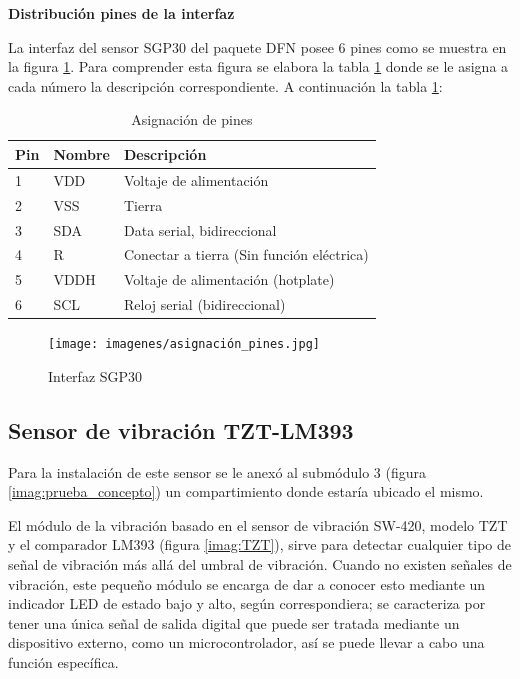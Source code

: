 \textbf{Distribución pines de la interfaz}

La interfaz del sensor SGP30 del paquete DFN posee 6 pines como se muestra en la figura \ref{imag:interfaz_sgp30}. Para comprender esta figura se elabora la tabla \ref{tab:asignacion_pines} donde se le asigna a cada número la descripción correspondiente. A continuación la tabla \ref{tab:asignacion_pines}:

\begin{table}[H]
    \centering
    \caption{Asignación de pines}
    \label{tab:asignacion_pines}
    \begin{tabular}{|l|l|l|}
    \hline
    \rowcolor[HTML]{9698ED} 
    Pin & Nombre & Descripción                               \\ \hline
    1   & VDD    & Voltaje de alimentación                   \\ \hline
    2   & VSS    & Tierra                                    \\ \hline
    3   & SDA    & Data serial, bidireccional                \\ \hline
    4   & R      & Conectar a tierra (Sin función eléctrica) \\ \hline
    5   & VDDH   & Voltaje de alimentación (hotplate)        \\ \hline
    6   & SCL    & Reloj serial (bidireccional)              \\ \hline
    \end{tabular}
\end{table}

\begin{figure}[H]
    \centering
    \texttt{[image: imagenes/asignación\_pines.jpg]}
    \caption{Interfaz SGP30}
    \label{imag:interfaz_sgp30}
 \end{figure}

\subsection{Sensor de vibración TZT-LM393}

Para la instalación de este sensor se le anexó al submódulo 3 (figura \ref{imag:prueba_concepto}) un compartimiento donde estaría ubicado el mismo.

El módulo de la vibración basado en el sensor de vibración SW-420, modelo TZT y el comparador LM393 (figura \ref{imag:TZT}), sirve para detectar cualquier tipo de señal de vibración más allá del umbral de vibración.
Cuando no existen señales de vibración, este pequeño módulo se encarga de dar a conocer esto mediante un indicador LED de estado bajo y alto, según correspondiera; se caracteriza por tener una única señal de salida digital que
puede ser tratada mediante un dispositivo externo, como un microcontrolador, así se puede llevar a cabo una función específica.\\

